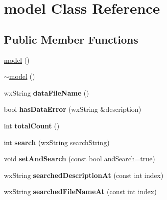 \hypertarget{classmodel}{\section{model Class Reference}
\label{classmodel}
}
\subsection*{Public Member Functions}
\begin{DoxyCompactItemize}
\item 
\hyperlink{classmodel_a89150458364164cfaf05f700365c1416}{model} ()
\item 
\hyperlink{classmodel_a23a7dbff52aedc7c5fbd1c81d419688f}{$\sim$model} ()
\item 
\hypertarget{classmodel_ab3fc4c1fbcfa7ea96c7b9b0516a95ba3}{wx\-String {\bfseries data\-File\-Name} ()}\label{classmodel_ab3fc4c1fbcfa7ea96c7b9b0516a95ba3}

\item 
\hypertarget{classmodel_a9595f91245525bbb9b77655f8d04cca0}{bool {\bfseries has\-Data\-Error} (wx\-String \&description)}\label{classmodel_a9595f91245525bbb9b77655f8d04cca0}

\item 
\hypertarget{classmodel_a06951073e129a0f1e9b0900e0fa0902b}{int {\bfseries total\-Count} ()}\label{classmodel_a06951073e129a0f1e9b0900e0fa0902b}

\item 
\hypertarget{classmodel_a553ddc8e4bf39d506fb5fb0ddd79d3eb}{int {\bfseries search} (wx\-String search\-String)}\label{classmodel_a553ddc8e4bf39d506fb5fb0ddd79d3eb}

\item 
\hypertarget{classmodel_ae43e9ef9b1cdb76a1266bc83beebe70b}{void {\bfseries set\-And\-Search} (const bool and\-Search=true)}\label{classmodel_ae43e9ef9b1cdb76a1266bc83beebe70b}

\item 
\hypertarget{classmodel_a2e40f85f552d71601f0ab11a92b823ac}{wx\-String {\bfseries searched\-Description\-At} (const int index)}\label{classmodel_a2e40f85f552d71601f0ab11a92b823ac}

\item 
\hypertarget{classmodel_a8226c0337db1cfb369727d78e52fbb18}{wx\-String {\bfseries searched\-File\-Name\-At} (const int index)}\label{classmodel_a8226c0337db1cfb369727d78e52fbb18}

\end{DoxyCompactItemize}


